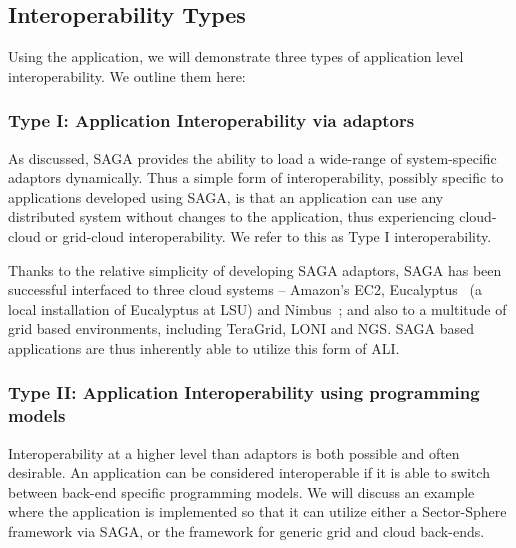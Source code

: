 \documentclass[3p,twocolumn]{elsarticle}
\begin{document}
\subsection{Interoperability Types}

Using the \wc application, we will demonstrate three types of
application level interoperability. We outline them here:


\subsubsection{Type I: Application Interoperability via adaptors}
%
%

As discussed, SAGA provides the ability to load a wide-range of
system-specific adaptors dynamically. Thus a simple form of
interoperability, possibly specific to applications developed using
SAGA, is that an application can use any distributed system without
changes to the application, thus experiencing cloud-cloud or
grid-cloud interoperability.  We refer to this as Type I
interoperability.


Thanks to the relative simplicity of developing SAGA adaptors, SAGA
has been successful interfaced to three cloud systems -- Amazon's EC2,
Eucalyptus~\cite{eucalyptus} (a local installation of Eucalyptus at
LSU) and Nimbus~\cite{nimbus}; and also to a multitude of grid based
environments, including TeraGrid, LONI and NGS.  SAGA based
applications are thus inherently able to utilize this form of ALI.

\subsubsection{Type II: Application Interoperability using programming
  models} %
%
%

Interoperability at a higher level than adaptors is both possible and
often desirable. An application can be considered interoperable if it
is able to switch between back-end specific programming models.  We
will discuss an example where the \wc application is implemented so
that it can utilize either a Sector-Sphere framework via SAGA, or the
\smr framework for generic grid and cloud back-ends.
\end{document}
